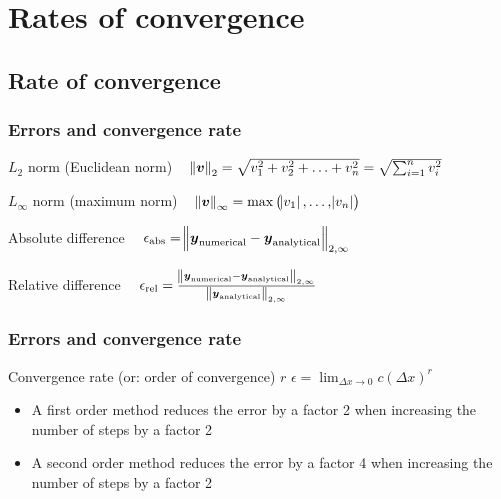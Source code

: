 \documentclass[11pt,table,final,fleqn,xcolor={usenames,dvipsnames,table}]{beamer}
\begin{document}
\section{Rates of convergence}
\subsection*{Rate of convergence}
\begin{frame}
  \frametitle{Errors and convergence rate}
  \begin{block}{$L_2$ norm (Euclidean norm)}
    $ \quad \norm{\boldsymbol{v}}_2 = \sqrt{v_1^2+v_2^2+\ldots+v_n^2} = \sqrt{\sum_{i=1}^n v_i^2} $
  \end{block}
  \begin{block}{$L_\infty$ norm (maximum norm)}
    $ \quad \norm{\boldsymbol{v}}_\infty = \text{max}\left( \abs{v_1},\ldots,\abs{v_n}\right) $
  \end{block}
  \begin{block}{Absolute difference}
    $ \quad \epsilon_\text{abs} = \norm{\boldsymbol{y}_\text{numerical} - \boldsymbol{y}_\text{analytical}}_{2,\infty} $
  \end{block}
  \begin{block}{Relative difference}
    $ \quad \epsilon_\text{rel} = \frac{\norm{\boldsymbol{y}_\text{numerical} - \boldsymbol{y}_\text{analytical}}_{2,\infty}}{\norm{\boldsymbol{y}_\text{analytical}}_{2,\infty}} $
  \end{block}
\end{frame}

\begin{frame}
  \frametitle{Errors and convergence rate}
  \footnotesize\selectfont
   \begin{block}{Convergence rate (or: order of convergence) $r$}
  $\displaystyle \epsilon = \lim_{\Delta x \rightarrow 0} c(\Delta x)^r $
  \end{block}
  \begin{itemize}
    \item A first order method reduces the error by a factor 2 when increasing the number of steps by a factor 2
    \item A second order method reduces the error by a factor 4 when increasing the number of steps by a factor 2
  \end{itemize}
\end{frame}
\end{document}
